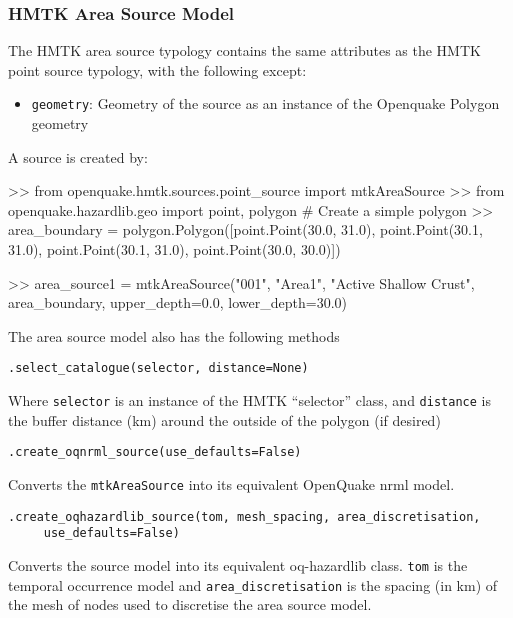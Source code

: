 \subsubsection{HMTK Area Source Model}

The HMTK area source typology contains the same attributes as the HMTK point source typology, with the following except:

\begin{itemize}
\item \verb=geometry=: Geometry of the source as an instance of the Openquake Polygon geometry
\end{itemize}

A source is created by:

\begin{python}[frame=single]
>> from openquake.hmtk.sources.point_source import mtkAreaSource
>> from openquake.hazardlib.geo import point, polygon
# Create a simple polygon
>> area_boundary = polygon.Polygon([point.Point(30.0, 31.0),
                                    point.Point(30.1, 31.0),
                                    point.Point(30.1, 31.0),
                                    point.Point(30.0, 30.0)]) 

>> area_source1 = mtkAreaSource("001",
                                "Area1",
                                "Active Shallow Crust",
                                area_boundary,
                                upper_depth=0.0,
                                lower_depth=30.0)
\end{python}

The area source model also has the following methods

\verb;.select_catalogue(selector, distance=None);

Where \verb=selector= is an instance of the HMTK ``selector'' class, and \verb=distance= is the buffer distance (km) around the outside of the polygon (if desired)


\verb;.create_oqnrml_source(use_defaults=False);

Converts the \verb=mtkAreaSource= into its equivalent OpenQuake nrml model.

\verb;.create_oqhazardlib_source(tom, mesh_spacing, area_discretisation,;\\
\verb;     use_defaults=False);

Converts the source model into its equivalent oq-hazardlib class. \verb=tom= is the temporal occurrence model and \verb=area_discretisation= is the spacing (in km) of the mesh of nodes used to discretise the area source model.


